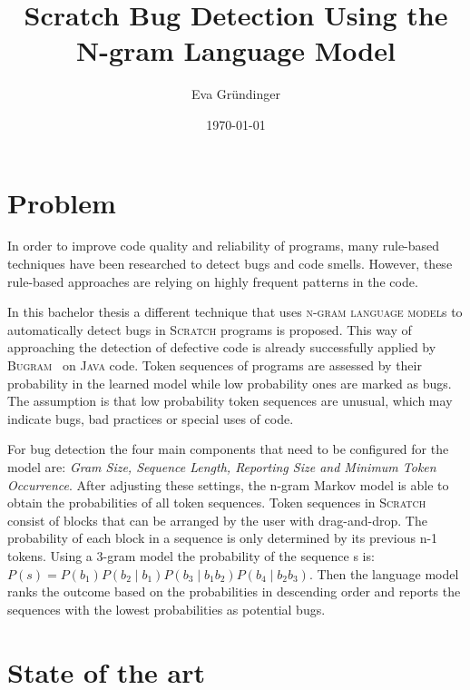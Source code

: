 \documentclass[
    numbers=noenddot,
    parskip=half-,
    fontsize=12pt,
    paper=a4,
    oneside,
    titlepage,
    bibliography=totoc,
    chapterprefix=false,
]{scrbook}
\title{Scratch Bug Detection Using the N-gram Language Model}
\author{Eva Gründinger}
\date{\today}
\newcommand{\ngram}{\textsc{n-gram language model}}
\newcommand{\bugram}{\textsc{Bugram}}
\newcommand{\scratch}{\textsc{Scratch}}
\newcommand{\java}{\textsc{Java}}
\begin{document}

    \frontmatter
    
    \tableofcontents
    \newpage


    \mainmatter

    \chapter{Problem}\label{ch:problem}
    In order to improve code quality and reliability of programs, many rule-based techniques have been researched to detect bugs and code smells. However, these rule-based approaches are relying on highly frequent patterns in the code. 
    
    In this bachelor thesis a different technique that uses \ngram{s} to automatically detect bugs in \scratch{} programs is proposed. This way of approaching the detection of defective code is already successfully applied by \bugram{}~\cite{bugram} on \java{} code. Token sequences of programs are assessed by their probability in the learned model while low probability ones are marked as bugs. The assumption is that low probability token sequences are unusual, which may indicate bugs, bad practices or special uses of code. 
    
    For bug detection the four main components that need to be configured for the model are: \textit{Gram Size, Sequence Length, Reporting Size and Minimum Token Occurrence}. After adjusting these settings, the n-gram Markov model is able to obtain the probabilities of all token sequences. Token sequences in \scratch{} consist of blocks that can be arranged by the user with drag-and-drop. The probability of each block in a sequence is only determined by its previous n-1 tokens. Using a 3-gram model the probability of the sequence s is:
    \(P(s) = P(b_{1})P(b_{2}\mid b_{1})P(b_{3}\mid b_{1}b_{2})P(b_{4}\mid b_{2}b_{3}) \). Then the language model ranks the outcome based on the probabilities in descending order and reports the sequences with the lowest probabilities as potential bugs. 
    

    \chapter{State of the art}\label{ch:state-of-the-art}
    
\end{document}
